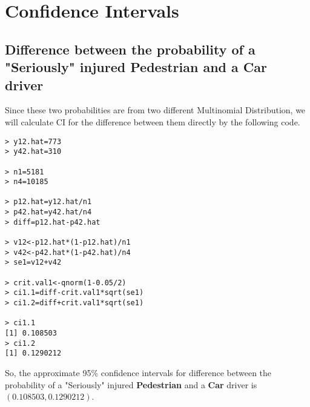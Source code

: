 \documentclass[12pt]{article}
\begin{document}
\newpage
\section{Confidence Intervals}
\subsection{Difference between the probability of a "Seriously" injured \textbf{Pedestrian} and a \textbf{Car} driver}
Since these two probabilities are from two different Multinomial Distribution, we will calculate CI for the difference between them directly by the following code.
\begin{verbatim}
> y12.hat=773
> y42.hat=310

> n1=5181
> n4=10185

> p12.hat=y12.hat/n1
> p42.hat=y42.hat/n4
> diff=p12.hat-p42.hat

> v12<-p12.hat*(1-p12.hat)/n1
> v42<-p42.hat*(1-p42.hat)/n4
> se1=v12+v42

> crit.val1<-qnorm(1-0.05/2)
> ci1.1=diff-crit.val1*sqrt(se1)
> ci1.2=diff+crit.val1*sqrt(se1)

> ci1.1
[1] 0.108503
> ci1.2
[1] 0.1290212
\end{verbatim}
So, the approximate 95\% confidence intervals for difference between the probability of a "Seriously" injured \textbf{Pedestrian} and a \textbf{Car} driver is $(0.108503, 0.1290212)$.
\end{document}

